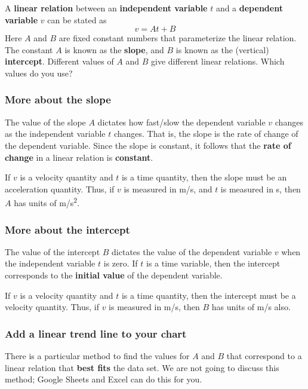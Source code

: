 A \textbf{linear relation} between an \textbf{independent variable} $t$ and a \textbf{dependent variable} $v$ can be stated as
\begin{equation}
    v = A t + B
\end{equation}
Here $A$ and $B$ are fixed constant numbers that parameterize the linear relation. The constant $A$ is known as the \textbf{slope}, and $B$ is known as the (vertical) \textbf{intercept}. Different values of $A$ and $B$ give different linear relations. Which values do you use?
%
\subsubsection{More about the slope}
%
The value of the slope $A$ dictates how fast/slow the dependent variable $v$ changes as the independent variable $t$ changes. That is, the slope is the rate of change of the dependent variable. Since the slope is constant, it follows that the \textbf{rate of change} in a linear relation is \textbf{constant}.

If $v$ is a velocity quantity and $t$ is a time quantity, then the slope must be an acceleration quantity. Thus, if $v$ is measured in m/s, and $t$ is measured in s, then $A$ has units of m/s\textsuperscript{2}.
%
\subsubsection{More about the intercept}
%
The value of the intercept $B$ dictates the value of the dependent variable $v$ when the independent variable $t$ is zero. If $t$ is a time variable, then the intercept corresponds to the \textbf{initial value} of the dependent variable.

If $v$ is a velocity quantity and $t$ is a time quantity, then the intercept must be a velocity quantity. Thus, if $v$ is measured in m/s, then $B$ has units of m/s also.
%
\subsubsection{Add a linear trend line to your chart}
%
There is a particular method to find the values for $A$ and $B$ that correspond to a linear relation that \textbf{best fits} the data set. We are not going to discuss this method; Google Sheets and Excel can do this for you.


